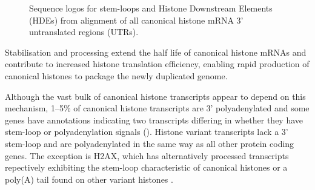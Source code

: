   \begin{figure}
    \centering
    \hfill
    \caption{%
      Sequence logos for stem-loops and Histone Downstream Elements (HDEs)
      from alignment of all canonical histone mRNA 3' untranslated
      regions (UTRs).
    }
  \end{figure}

  Stabilisation and processing extend the half life of canonical histone mRNAs
  and contribute to increased histone translation efficiency,
  enabling rapid production of canonical histones to package the newly duplicated genome.

  Although the vast bulk of canonical histone transcripts appear to depend on this mechanism,
  1--5\% of canonical histone transcripts are 3' polyadenylated \citep{YangGenomeBiol2011}
  and some genes have annotations indicating two transcripts
  differing in whether they have stem-loop or polyadenylation
  signals ().
  Histone variant transcripts lack a 3' stem-loop and are 
  polyadenylated in the same way as all other protein coding genes.
  The exception is H2AX, which has alternatively processed transcripts
  repectively exhibiting the stem-loop characteristic of canonical histones
  or a poly(A) tail found on other variant histones \citep{HTwoAX-transcripts,our-H2AX-review}.
